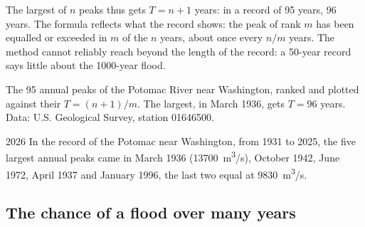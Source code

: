 The largest of $n$ peaks thus gets $T = n + 1$ years: in a record of
\num{95} years, \num{96} years. The formula reflects what the record shows:
the peak of rank $m$ has been equalled or exceeded in $m$ of the $n$ years,
about once every $n/m$ years. The method cannot reliably reach beyond the
length of the record: a \num{50}-year record says little about the
\num{1000}-year flood.

\begin{omfigure}

{\small The \num{95} annual peaks of the Potomac River near Washington, ranked
and plotted against their  $T = (n+1)/m$. The largest, in March
1936, gets $T = 96$ years. Data: U.S. Geological Survey, station 01646500.}
\end{omfigure}

\begin{dated}{2026}
In the record of the Potomac near Washington, from 1931 to 2025, the five
largest annual peaks came in March 1936 (\qty{13700}{m^3/s}), October 1942,
June 1972, April 1937 and January 1996, the last two equal at
\qty{9830}{m^3/s}.
\end{dated}

\subsection*{The chance of a flood over many years}

